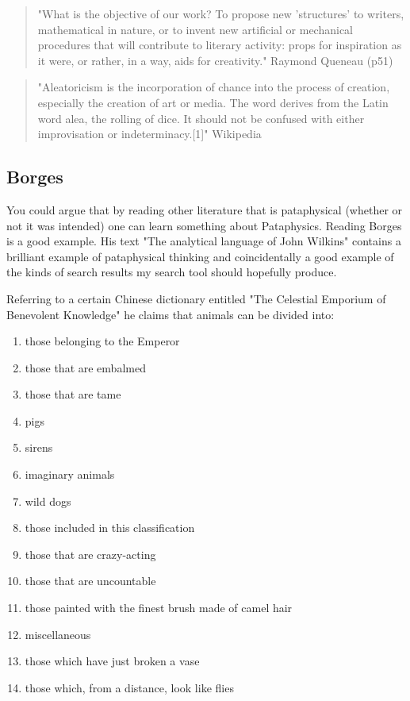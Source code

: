 \begin{quote}
  "What is the objective of our work? To propose new 'structures' to writers, mathematical in nature, or to invent new artificial or mechanical procedures that will contribute to literary activity: props for inspiration as it were, or rather, in a way, aids for creativity." Raymond Queneau (p51)
\end{quote}

\begin{quote}
  "Aleatoricism is the incorporation of chance into the process of creation, especially the creation of art or media. The word derives from the Latin word alea, the rolling of dice. It should not be confused with either improvisation or indeterminacy.[1]" Wikipedia
\end{quote}

\subsection{Borges}

You could argue that by reading other literature that is pataphysical (whether or not it was intended) one can learn something about Pataphysics. Reading Borges \citep{Borges1964, Borges2004, Borges1957, Borges2010a, Borges2010b, Borges1942} is a good example. His text "The analytical language of John Wilkins" \citep{Borges1942} contains a brilliant example of pataphysical thinking and coincidentally a good example of the kinds of search results my search tool should hopefully produce.

Referring to a certain Chinese dictionary entitled "The Celestial Emporium of Benevolent Knowledge" he claims that animals can be divided into:

\begin{enumerate}
  \item	those belonging to the Emperor
  \item	those that are embalmed
  \item	those that are tame
  \item	pigs
  \item	sirens
  \item	imaginary animals
  \item	wild dogs
  \item	those included in this classification
  \item	those that are crazy-acting
  \item	those that are uncountable
  \item	those painted with the finest brush made of camel hair
  \item	miscellaneous
  \item	those which have just broken a vase
  \item	those which, from a distance, look like flies
\end{enumerate}

